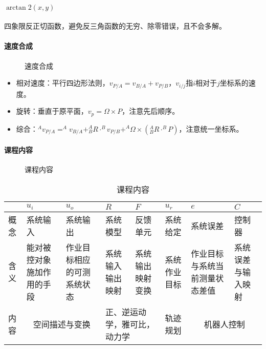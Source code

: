 \documentclass[
12pt, %
a4paper, 
oneside, %
headinclude,footinclude, %
]{scrartcl}
\begin{document}
\paragraph{$ \arctan 2(x, y) $}
四象限反正切函数，避免反三角函数的无穷、除零错误，且不会多解。
\paragraph{速度合成}
\begin{figure}[H]
\centering
{} \quad
{}
\caption[速度合成]{速度合成}
\end{figure}

\begin{itemize}
\item 相对速度：平行四边形法则，$ v_{P/A} = v_{B/A} + v_{P/B} $，$ v_{i/j} $指$ i $相对于$ j $坐标系的速度。
\item 旋转：垂直于原平面，$ v_p = \Omega \times P $，注意先后顺序。
\item 综合：$ ^A v_{P/A} = ^A v_{B/A} + ^A_B R \cdot ^B v_{P/B} + ^A \Omega \times (^A_B R \cdot ^B P) $，注意统一坐标系。
\end{itemize}
\paragraph{课程内容}
\begin{figure}[H]
\centering
{} \quad
{}
\caption[课程内容]{课程内容}
\end{figure}

\begin{table}[hbt]
\caption{课程内容}
\centering
\begin{tabular}{|p{0.5cm}|p{2cm}|p{2cm}|p{2cm}|p{2cm}|p{2cm}|p{2cm}|p{2cm}|}
\hline
& $ u_i $ & $ u_o $ & $ R $ & $ F $ & $ u_r $ & $ e $ & $ C $ \\
\hline
概念 & 系统输入 & 系统输出 & 系统模型 & 反馈单元 & 系统给定 & 系统误差 & 控制器 \\
\hline
含义 & 能对被控对象施加作用的手段 & 作业目标相应的可测系统状态 & 系统输入输出映射 & 系统输出映射变换 & 系统作业目标 & 作业目标与系统当前测量状态差值 & 系统误差与输入映射 \\
\hline
内容 & \multicolumn{2}{c|}{空间描述与变换} & \multicolumn{2}{p{4cm}|}{正、逆运动学，雅可比，动力学} & 轨迹规划 & \multicolumn{2}{c|}{机器人控制} \\
\hline
\end{tabular}
\end{table}
\end{document}

